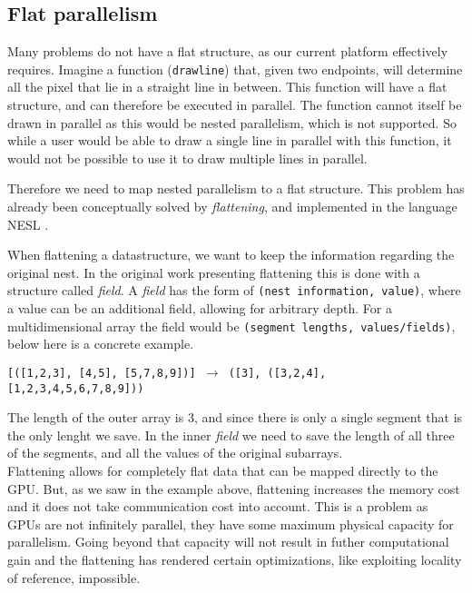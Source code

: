 \subsection{Flat parallelism}
Many problems do not have a flat structure, as our current platform
effectively requires. Imagine a function (\texttt{drawline}) that, given two
endpoints, will determine all the pixel that lie in a straight line in between.
This function will have a flat structure, and can therefore be executed
in parallel. The function cannot itself be drawn in parallel as this would be
nested parallelism, which is not supported. So while a user would be able to draw a
single line in parallel with this function, it would not be possible to use it
to draw multiple lines in parallel.

Therefore we need to map nested parallelism to a flat structure. This problem
has already been conceptually solved by \textit{flattening}, and implemented in
the language NESL \cite{nesl}. 

When flattening a datastructure, we want to keep the information regarding the
original nest. In the original work presenting flattening \cite{flat} this is 
done
with a structure called \textit{field}. A \textit{field} has the form of 
\texttt{(nest
information, value)}, where a value can be an additional field, allowing for
arbitrary depth. For a multidimensional array the field would be
\texttt{(segment lengths, values/fields)}, below here is a concrete example.  
\begin{center}
  \texttt{[([1,2,3], [4,5], [5,7,8,9])] $\to$ ([3], ([3,2,4],
[1,2,3,4,5,6,7,8,9]))}
\end{center}
The length of the outer array is 3, and since there is only a single segment
that is the only lenght we save. In the inner \textit{field} we need to save
the length of all three of the segments, and all the values of the original
subarrays.\\

Flattening allows for completely flat data that can be mapped directly to 
the
GPU. But, as we saw in the example above, flattening increases the memory cost and
it does not take communication cost into account. This is a problem as GPUs are 
not
infinitely parallel, they have some maximum physical capacity for parallelism.
Going beyond that capacity will not result in futher computational gain and the
flattening has rendered certain optimizations, like exploiting locality of 
reference,
impossible.

